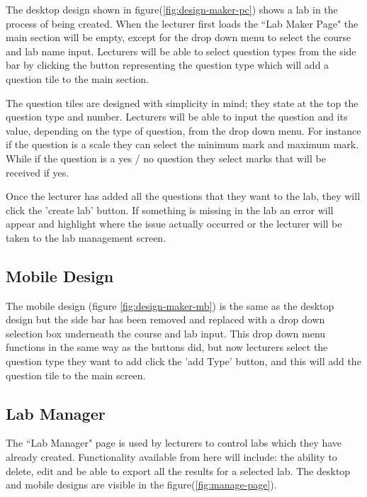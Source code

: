 \documentclass[11pt]{report}
\begin{document}
The desktop design shown in figure(\ref{fig:design-maker-pc}) shows a lab in the process of being created. When the lecturer first loads the ``Lab Maker Page" the main section will be empty, except for the drop down menu to select the course and lab name input. Lecturers will be able to select question types from the side bar by clicking the button representing the question type which will add a question tile to the main section. 

The question tiles are designed with simplicity in mind; they state at the top the question type and number. Lecturers will be able to input the question and its value, depending on the type of question, from the drop down menu. For instance if the question is a scale they can select the minimum mark and maximum mark. While if the question is a yes / no question they select marks that will be received if yes. 

Once the lecturer has added all the questions that they want  to the lab, they will click the 'create lab' button. If something is missing in the lab an error will appear and highlight where the issue actually  occurred or the lecturer will be taken to the lab management screen.


\subsection*{Mobile Design}


The mobile design (figure \ref{fig:design-maker-mb}) is the same as the desktop design but the side bar has been removed and replaced with a drop down selection box underneath the course and lab input. This drop down menu functions in the same way as the buttons did, but now lecturers select the question type they want to add click the 'add Type' button, and this will add the question tile to the main screen.


\subsection{Lab Manager}
The ``Lab Manager" page is used by lecturers to control labs which they have already created. Functionality available from here will include: the ability to delete, edit and be able to export all the results for a selected lab. The desktop and mobile designs are visible in the figure(\ref{fig:manage-page}). 
\end{document}
